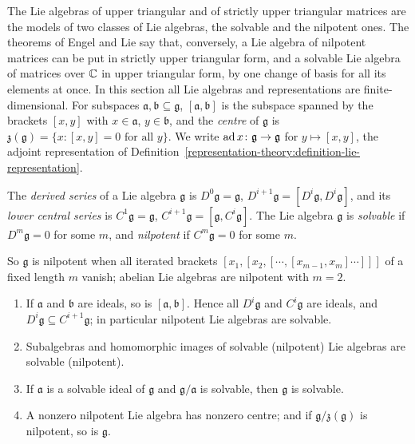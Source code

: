 The Lie algebras of upper triangular and of strictly upper triangular matrices are the models of two classes of Lie algebras, the solvable and the nilpotent ones.
The theorems of Engel and Lie say that, conversely, a Lie algebra of nilpotent matrices can be put in strictly upper triangular form, and a solvable Lie algebra of
matrices over $\mathbb{C}$ in upper triangular form, by one change of basis for all its elements at once. In this section all Lie algebras and representations are
finite-dimensional. For subspaces $\mathfrak{a}, \mathfrak{b} \subseteq \mathfrak{g}$, $[\mathfrak{a}, \mathfrak{b}]$ is the subspace spanned by the brackets $[x, y]$
with $x \in \mathfrak{a}$, $y \in \mathfrak{b}$, and the \emph{centre} of $\mathfrak{g}$ is $\mathfrak{z}(\mathfrak{g}) = \{x : [x, y] = 0 \text{ for all } y\}$. We write
$\operatorname{ad} x \colon \mathfrak{g} \to \mathfrak{g}$ for $y \mapsto [x, y]$, the adjoint representation of Definition~\ref{representation-theory:definition-lie-representation}.

\begin{definition}\label{representation-theory:definition-solvable}
The \emph{derived series} of a Lie algebra $\mathfrak{g}$ is $D^0\mathfrak{g} = \mathfrak{g}$, $D^{i+1}\mathfrak{g} = [D^i\mathfrak{g}, D^i\mathfrak{g}]$, and its
\emph{lower central series} is $C^1\mathfrak{g} = \mathfrak{g}$, $C^{i+1}\mathfrak{g} = [\mathfrak{g}, C^i\mathfrak{g}]$. The Lie algebra $\mathfrak{g}$ is \emph{solvable}
if $D^m\mathfrak{g} = 0$ for some $m$, and \emph{nilpotent} if $C^m\mathfrak{g} = 0$ for some $m$.
\end{definition}

So $\mathfrak{g}$ is nilpotent when all iterated brackets $[x_1, [x_2, [\cdots, [x_{m-1}, x_m]\cdots]]]$ of a fixed length $m$ vanish; abelian Lie algebras are nilpotent
with $m = 2$.

\begin{lemma}\label{representation-theory:lemma-solvable}
\begin{enumerate}
\item If $\mathfrak{a}$ and $\mathfrak{b}$ are ideals, so is $[\mathfrak{a}, \mathfrak{b}]$. Hence all $D^i\mathfrak{g}$ and $C^i\mathfrak{g}$ are ideals, and
$D^i\mathfrak{g} \subseteq C^{i+1}\mathfrak{g}$; in particular nilpotent Lie algebras are solvable.
\item Subalgebras and homomorphic images of solvable (nilpotent) Lie algebras are solvable (nilpotent).
\item If $\mathfrak{a}$ is a solvable ideal of $\mathfrak{g}$ and $\mathfrak{g}/\mathfrak{a}$ is solvable, then $\mathfrak{g}$ is solvable.
\item A nonzero nilpotent Lie algebra has nonzero centre; and if $\mathfrak{g}/\mathfrak{z}(\mathfrak{g})$ is nilpotent, so is $\mathfrak{g}$.
\end{enumerate}
\end{lemma}


